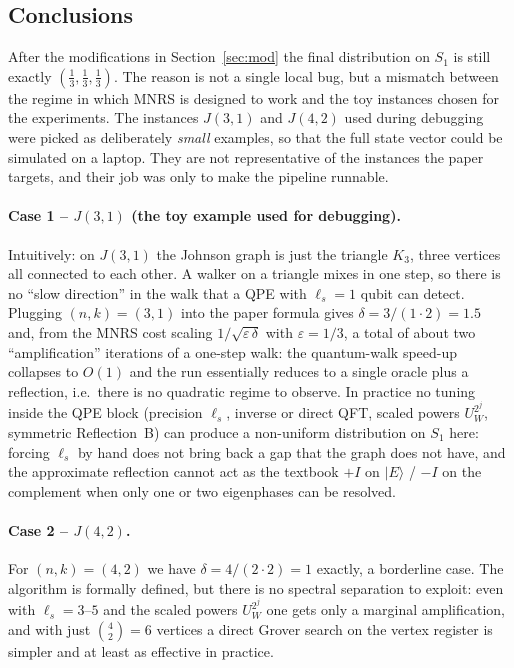 \documentclass[11pt,a4paper]{article}
\begin{document}
\subsection{Conclusions}

After the modifications in Section~\ref{sec:mod} the final distribution
on $S_1$ is still exactly $(\tfrac13,\tfrac13,\tfrac13)$. The reason is
not a single local bug, but a mismatch between the regime in which
MNRS is designed to work and the toy instances chosen for the
experiments. The instances $J(3,1)$ and $J(4,2)$
used during debugging were picked as deliberately \emph{small} examples,
so that the full state vector could be simulated on a laptop. They are
not representative of the instances the paper targets, and their job
was only to make the pipeline runnable.

\paragraph{Case 1 -- $J(3,1)$ (the toy example used for debugging).}
Intuitively: on $J(3,1)$ the Johnson graph is just the triangle $K_3$,
three vertices all connected to each other. A walker on a triangle
mixes in one step, so there is no ``slow direction'' in the walk that
a QPE with $\ell_s=1$ qubit can detect. Plugging $(n,k)=(3,1)$ into
the paper formula gives $\delta=3/(1\cdot 2)=1.5$ and, from the MNRS
cost scaling $1/\sqrt{\varepsilon\,\delta}$ with $\varepsilon=1/3$,
a total of about two ``amplification'' iterations of a one-step walk:
the quantum-walk speed-up collapses to $O(1)$ and the run essentially
reduces to a single oracle plus a reflection, i.e.\ there is no
quadratic regime to observe. In practice no tuning inside the QPE
block (precision $\ell_s$, inverse or direct QFT, scaled powers
$U_W^{2^j}$, symmetric Reflection~B) can produce a non-uniform
distribution on $S_1$ here: forcing $\ell_s$ by hand does not bring
back a gap that the graph does not have, and the approximate
reflection cannot act as the textbook $+I$ on $|E\rangle$ / $-I$ on
the complement when only one or two eigenphases can be resolved.

\paragraph{Case 2 -- $J(4,2)$.}
For $(n,k)=(4,2)$ we have $\delta = 4/(2\cdot 2) = 1$ exactly, a
borderline case. The algorithm is formally defined, but there is no
spectral separation to exploit: even with $\ell_s=3$--$5$ and the
scaled powers $U_W^{2^j}$ one gets only a marginal amplification, and
with just $\binom{4}{2}=6$ vertices a direct Grover search on the
vertex register is simpler and at least as effective in practice.
\end{document}
